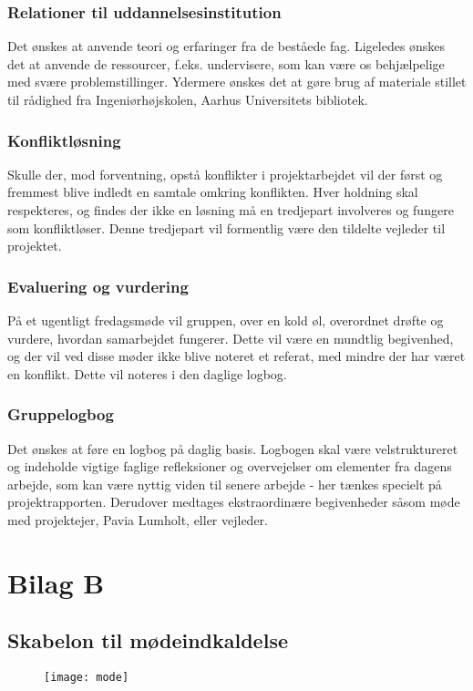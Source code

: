 \subsubsection{Relationer til uddannelsesinstitution}
Det ønskes at anvende teori og erfaringer fra de beståede fag. Ligeledes ønskes det at anvende de ressourcer, f.eks. undervisere, som kan være os behjælpelige med svære problemstillinger. Ydermere ønskes det at gøre brug af materiale stillet til rådighed fra Ingeniørhøjskolen, Aarhus Universitets bibliotek. 

\subsubsection{Konfliktløsning}
Skulle der, mod forventning, opstå konflikter i projektarbejdet vil der først og fremmest blive indledt en samtale omkring konflikten. Hver holdning skal respekteres, og findes der ikke en løsning må en tredjepart involveres og fungere som konfliktløser. Denne tredjepart vil formentlig være den tildelte vejleder til projektet.   

\subsubsection{Evaluering og vurdering}
På et ugentligt fredagsmøde vil gruppen, over en kold øl, overordnet drøfte og vurdere, hvordan samarbejdet fungerer. Dette vil være en mundtlig begivenhed, og der vil ved disse møder ikke blive noteret et referat, med mindre der har været en konflikt. Dette vil noteres i den daglige logbog.

\subsubsection{Gruppelogbog} 
Det ønskes at føre en logbog på daglig basis. Logbogen skal være velstruktureret og  indeholde vigtige faglige refleksioner og overvejelser om elementer fra dagens arbejde, som kan være nyttig viden til senere arbejde - her tænkes specielt på projektrapporten. Derudover medtages ekstraordinære begivenheder såsom møde med projektejer, Pavia Lumholt, eller vejleder.

     

\newpage

\section{Bilag B}

\subsection{Skabelon til mødeindkaldelse}
\label{App:skabelon}
\begin{figure}[htb]
\centering
\texttt{[image: mode]}	
\end{figure}

